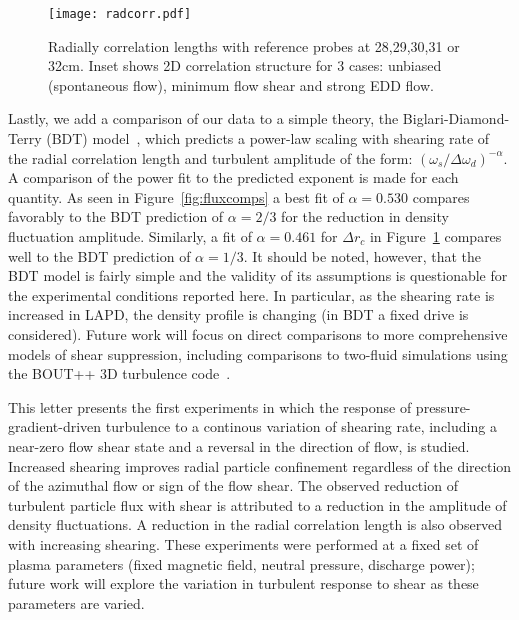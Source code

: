 \documentclass[aps,prl,amsmath,amssymb,preprint,superscriptaddress]{revtex4}
\begin{document}
\begin{figure}[!htbp]
\centerline{
\texttt{[image: radcorr.pdf]}}
\caption{\label{fig:radcorr} Radially correlation lengths with
  reference probes at 28,29,30,31 or 32cm. Inset shows 2D correlation
  structure for 3 cases: unbiased (spontaneous flow), minimum flow
  shear and strong EDD flow.}
\end{figure}

Lastly, we add a comparison of our data to a simple theory, the
Biglari-Diamond-Terry (BDT) model~\cite{biglari90}, which predicts a
power-law scaling with shearing rate of the radial correlation length and turbulent
amplitude of the form: $\left(\omega_{s}/\Delta
\omega_{d}\right)^{-\alpha}$. A comparison of the power fit to the
predicted exponent is made for each quantity. As seen in
Figure~\ref{fig:fluxcomps} a best fit of $\alpha = 0.530$ compares
favorably to the BDT prediction of $\alpha = 2/3$ for the reduction in
density fluctuation amplitude. Similarly, a fit of $\alpha = 0.461$
for $\Delta r_{c}$ in Figure~\ref{fig:radcorr} compares well to the BDT
prediction of $\alpha = 1/3$.   It should be noted, however, that the
BDT model is fairly simple and the validity of its assumptions is
questionable for the experimental conditions reported here.  In
particular, as the shearing rate is increased in LAPD, the density
profile is changing (in BDT a fixed drive is considered).  Future work
will focus on direct comparisons to more comprehensive models of shear
suppression, including comparisons to two-fluid simulations using the
BOUT++ 3D turbulence code~\cite{umansky11}.  

This letter presents the first experiments in which the response of
pressure-gradient-driven turbulence to a continous
variation of shearing rate, including a near-zero flow shear state and
a reversal in the direction of flow, is studied.  Increased shearing
improves radial particle confinement regardless of the direction of
the azimuthal flow or sign of the flow shear. The observed reduction of
turbulent particle flux with shear is attributed to a reduction in the
amplitude of density fluctuations.  A reduction in the radial
correlation length is also observed with increasing shearing. These
experiments were performed at a fixed set of plasma parameters (fixed
magnetic field, neutral pressure, discharge power); future work will
explore the variation in turbulent response to shear as these
parameters are varied.  

\end{document}
